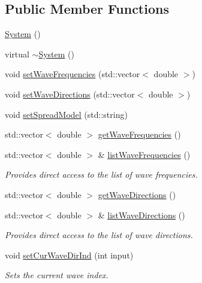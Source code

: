 \subsection*{Public Member Functions}
\begin{DoxyCompactItemize}
\item 
\hyperlink{classosea_1_1ofreq_1_1_system_ae317936c9bcf1374d61745572e0f2f8a}{System} ()
\item 
virtual \hyperlink{classosea_1_1ofreq_1_1_system_a3be70bb338e3f062f821173fd15680d0}{$\sim$\-System} ()
\item 
void \hyperlink{classosea_1_1ofreq_1_1_system_ac044fdc41aa436151bea0c81c8f70bc1}{set\-Wave\-Frequencies} (std\-::vector$<$ double $>$)
\item 
void \hyperlink{classosea_1_1ofreq_1_1_system_a246decc05b383e47fba6d42318cf64ef}{set\-Wave\-Directions} (std\-::vector$<$ double $>$)
\item 
void \hyperlink{classosea_1_1ofreq_1_1_system_abeb34bbe60c3f1490352695839b513f5}{set\-Spread\-Model} (std\-::string)
\item 
std\-::vector$<$ double $>$ \hyperlink{classosea_1_1ofreq_1_1_system_a18b18022b6468a41dfdbfc49c881b933}{get\-Wave\-Frequencies} ()
\item 
std\-::vector$<$ double $>$ \& \hyperlink{classosea_1_1ofreq_1_1_system_a02a78c7751da784608be2dc2afbb4022}{list\-Wave\-Frequencies} ()
\begin{DoxyCompactList}\small\item\em Provides direct access to the list of wave frequencies. \end{DoxyCompactList}\item 
std\-::vector$<$ double $>$ \hyperlink{classosea_1_1ofreq_1_1_system_a8e1d633a4b604223236e4cc4de35bd70}{get\-Wave\-Directions} ()
\item 
std\-::vector$<$ double $>$ \& \hyperlink{classosea_1_1ofreq_1_1_system_a18cbe26b239cf4ee83210ac6679f773f}{list\-Wave\-Directions} ()
\begin{DoxyCompactList}\small\item\em Provides direct access to the list of wave directions. \end{DoxyCompactList}\item 
void \hyperlink{classosea_1_1ofreq_1_1_system_a1bdee1bedde63db2d813fda1036f8299}{set\-Cur\-Wave\-Dir\-Ind} (int input)
\begin{DoxyCompactList}\small\item\em Sets the current wave index. \end{DoxyCompactList}\item 

\end{DoxyCompactItemize}
